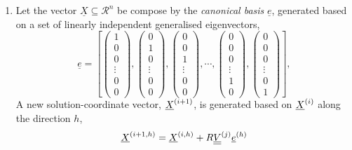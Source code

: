 \begin{enumerate}[{\bf Step 1: }]
   \item Let the vector $\underline{X}\subseteq\mathcal{R}^{n}$ be compose by the {\it canonical basis} $\underline{e}$, \ie generated based on a set of linearly independent generalised eigenvectors,
   \begin{displaymath}
      \underline{e} = \left[
             \begin{pmatrix}1 \\ 0 \\ 0 \\ \vdots \\ 0 \\ 0 \end{pmatrix},
             \begin{pmatrix}0 \\ 1 \\ 0 \\ \vdots \\ 0 \\ 0 \end{pmatrix},
             \begin{pmatrix}0 \\ 0 \\ 1 \\ \vdots \\ 0 \\ 0 \end{pmatrix},
             \cdots,
             \begin{pmatrix}0 \\ 0 \\ 0 \\ \vdots \\ 1 \\ 0 \end{pmatrix},
             \begin{pmatrix}0 \\ 0 \\ 0 \\ \vdots \\ 0 \\ 1 \end{pmatrix}
      \right],
   \end{displaymath}
   A new solution-coordinate vector, $\mfr[\underline{X}]{}{i+1}$, is generated based on $\mfr[\underline{X}]{}{i}$ along the direction $h$,
      \begin{equation}
         \mfr[\underline{X}]{}{i+1,h} = \mfr[\underline{X}]{}{i,h} + R \mfr[\underline{\underline{V}}]{}{j}\mfr[\underline{e}]{}{h}
      \end{equation}

\end{enumerate}

